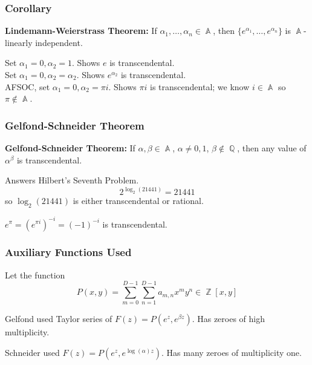 \documentclass{beamer}
\DeclareMathOperator{\A}{\mathbb{A}}
\DeclareMathOperator{\Q}{\mathbb{Q}}
\DeclareMathOperator{\Z}{\mathbb{Z}}
\begin{document}
    \begin{frame}
        \frametitle{Corollary}
        \begin{center}
            \begin{mybox}
                \textbf{Lindemann-Weierstrass Theorem:} If $\alpha_1, \ldots, \alpha_n \in \A$, then $\{e^{\alpha_1}, \ldots, e^{\alpha_n}\}$ is $\A$-linearly independent.
            \end{mybox}       
            Set $\alpha_1 = 0, \alpha_2 = 1$. Shows $e$ is transcendental. \\
            Set $\alpha_1 = 0, \alpha_2 = \alpha_2$. Shows $e^{\alpha_2}$ is transcendental. \\
            AFSOC, set $\alpha_1 = 0, \alpha_2 = \pi i$. Shows $\pi i$ is transcendental; we know $i \in \A$ so $\pi \notin \A$. 
        \end{center}
    \end{frame}

    \begin{frame}
        \frametitle{Gelfond-Schneider Theorem}
        \begin{center}
            \begin{mybox}
                \textbf{Gelfond-Schneider Theorem:} If $\alpha, \beta \in \A$, $\alpha \neq 0, 1$, $\beta \notin \Q$, then any value of ${\alpha}^{\beta}$ is transcendental.
            \end{mybox}       
            Answers Hilbert's Seventh Problem.
            \[2^{\log_2(21441)} = 21441\] so $\log_2(21441)$ is either transcendental or rational.\par
            $e^{\pi} = {\left(e^{\pi i}\right)}^{-i} = {(-1)}^{-i}$ is transcendental.
        \end{center}
    \end{frame}

    \begin{frame}
        \frametitle{Auxiliary Functions Used}
        \begin{center}
        Let the function
        \[P(x,y) = \sum\limits_{m=0}^{D-1}\sum\limits_{n=1}^{D-1}a_{m,n}{x}^{m}y^{n} \in \Z[x,y]\]

        Gelfond used Taylor series of $F(z) = P(e^{z}, e^{\beta z})$. Has zeroes of high multiplicity.\par

        Schneider used $F(z) = P(e^{z}, e^{\log(\alpha)z})$. Has many zeroes of multiplicity one.\par
        \end{center}
    \end{frame}
\end{document}
